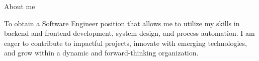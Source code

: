 \documentclass[]{kyvernitis-resume}
\begin{document}
\resumeheader
{}
{}
{}
{}
{\address{Karaj, Alborz Province, Iran}}
{}

\begin{section}{About me}

To obtain a Software Engineer position that allows me to utilize my skills in backend and frontend development, system design, and process automation. I am eager to contribute to impactful projects, innovate with emerging technologies, and grow within a dynamic and forward-thinking organization.

\end{section}
\end{document}
